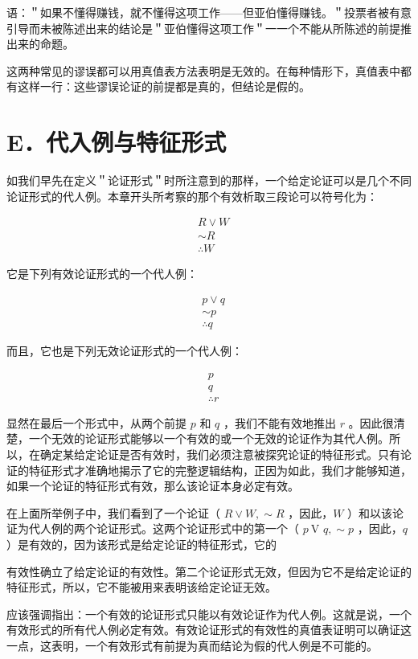 语：＂如果不懂得赚钱，就不懂得这项工作——但亚伯懂得赚钱。＂投票者被有意引导而未被陈述出来的结论是＂亚伯懂得这项工作＂一一个不能从所陈述的前提推出来的命题。

这两种常见的谬误都可以用真值表方法表明是无效的。在每种情形下，真值表中都有这样一行：这些谬误论证的前提都是真的，但结论是假的。

\section*{E．代入例与特征形式}
如我们早先在定义＂论证形式＂时所注意到的那样，一个给定论证可以是几个不同论证形式的代人例。本章开头所考察的那个有效析取三段论可以符号化为：

$$
\begin{aligned}
& R \vee W \\
& \sim R \\
& \therefore W
\end{aligned}
$$

它是下列有效论证形式的一个代人例：

$$
\begin{aligned}
& p \vee q \\
& \sim p \\
& \therefore q
\end{aligned}
$$

而且，它也是下列无效论证形式的一个代人例：

$$
\begin{aligned}
& p \\
& q \\
& \therefore r
\end{aligned}
$$

显然在最后一个形式中，从两个前提 $p$ 和 $q$ ，我们不能有效地推出 $r$ 。因此很清楚，一个无效的论证形式能够以一个有效的或一个无效的论证作为其代人例。所以，在确定某给定论证是否有效时，我们必须注意被探究论证的特征形式。只有论证的特征形式才准确地揭示了它的完整逻辑结构，正因为如此，我们才能够知道，如果一个论证的特征形式有效，那么该论证本身必定有效。

在上面所举例子中，我们看到了一个论证（ $R \vee W, \sim R$ ，因此，$W$ ）和以该论证为代人例的两个论证形式。这两个论证形式中的第一个（ $p \mathrm{~V}$ $q, \sim p$ ，因此，$q$ ）是有效的，因为该形式是给定论证的特征形式，它的

有效性确立了给定论证的有效性。第二个论证形式无效，但因为它不是给定论证的特征形式，所以，它不能被用来表明该给定论证无效。

应该强调指出：一个有效的论证形式只能以有效论证作为代人例。这就是说，一个有效形式的所有代人例必定有效。有效论证形式的有效性的真值表证明可以确证这一点，这表明，一个有效形式有前提为真而结论为假的代人例是不可能的。


